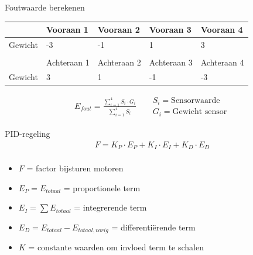 \documentclass[t,12pt,english
\ifx\beamermode\undefined\else,\beamermode\fi
]{beamer}
\begin{document}
\begin{frame}{Foutwaarde berekenen}
\begin{table}[H]
	\centering
	\begin{tabular}{lllll}
		\hline
		\multicolumn{1}{|l|}{}           & \multicolumn{1}{l|}{Vooraan 1}   & \multicolumn{1}{l|}{Vooraan 2}   & \multicolumn{1}{l|}{Vooraan 3}   & \multicolumn{1}{l|}{Vooraan 4}   \\ \hline
		\multicolumn{1}{|l|}{Gewicht} & \multicolumn{1}{l|}{-3}          & \multicolumn{1}{l|}{-1}          & \multicolumn{1}{l|}{1}           & \multicolumn{1}{l|}{3}           \\ \hline
		&                                  &                                  &                                  &                                  \\ \hline
		\multicolumn{1}{|l|}{}           & \multicolumn{1}{l|}{Achteraan 1} & \multicolumn{1}{l|}{Achteraan 2} & \multicolumn{1}{l|}{Achteraan 3} & \multicolumn{1}{l|}{Achteraan 4} \\ \hline
		\multicolumn{1}{|l|}{Gewicht} & \multicolumn{1}{l|}{3}           & \multicolumn{1}{l|}{1}           & \multicolumn{1}{l|}{-1}          & \multicolumn{1}{l|}{-3}           \\ \hline
	\end{tabular}
\end{table}

\begin{align*}
E_{fout} = \frac{\sum\limits_{i=1}^{4}S_{i}\cdot G_{i}}{\sum\limits_{i=1}^{4}S_{i}} &&
\begin{aligned}
S_i=\text{Sensorwaarde}\\
G_i=\text{Gewicht sensor}
\end{aligned}
\end{align*}
\end{frame}

\begin{frame}{PID-regeling}
\begin{gather*}
F = K_P \cdot E_P + K_I \cdot E_I + K_D \cdot E_D\\
\end{gather*}
\begin{itemize}
	\item[] $F$ = factor bijsturen motoren
	\item[] $E_P = E_{totaal}$ = proportionele term
	\item[] $E_I = \sum E_{totaal}$ = integrerende term
	\item[] $E_D = E_{totaal} - E_{totaal,vorig}$ = differenti\"erende term
	\item[] $K$ = constante waarden om invloed term te schalen 
\end{itemize}

\end{frame}
\end{document}

